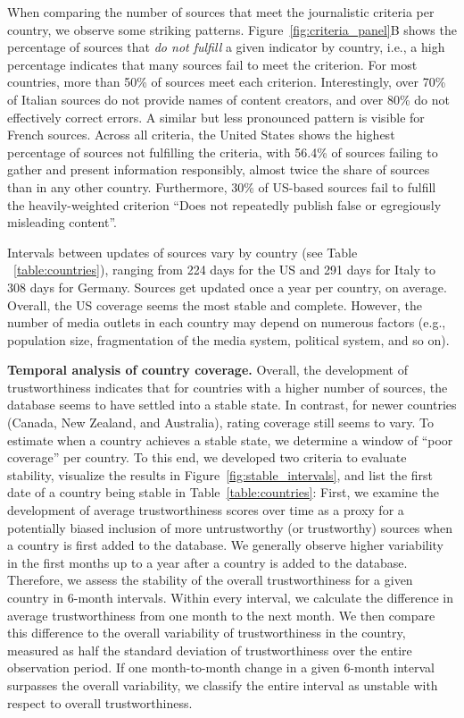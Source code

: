\documentclass[12pt,twoside]{article}
\begin{document}
When comparing the number of sources that meet the journalistic criteria per country, we observe some striking patterns. 
Figure~\ref{fig:criteria_panel}B shows the percentage of sources that \emph{do not fulfill} a given indicator by country, i.e., a high percentage indicates that many sources fail to meet the criterion.
For most countries, more than 50\% of sources meet each criterion. 
Interestingly, over 70\% of Italian sources do not provide names of content creators, and over 80\% do not effectively correct errors. 
A similar but less pronounced pattern is visible for French sources. 
Across all criteria, the United States shows the highest percentage of sources not fulfilling the criteria, with 56.4\% of sources failing to gather and present information responsibly, almost twice the share of sources than in any other country.
Furthermore, 30\% of US-based sources fail to fulfill the heavily-weighted criterion ``Does not repeatedly publish false or egregiously misleading content''.

Intervals between updates of sources vary by country (see Table ~\ref{table:countries}), ranging from 224 days for the US and 291 days for Italy to 308 days for Germany. 
Sources get updated once a year per country, on average. 
Overall, the US coverage seems the most stable and complete. 
However, the number of media outlets in each country may depend on numerous factors (e.g., population size, fragmentation of the media system, political system, and so on). 


\textbf{Temporal analysis of country coverage.}
Overall, the development of trustworthiness indicates that for countries with a higher number of sources, the database seems to have settled into a stable state. 
In contrast, for newer countries (Canada, New Zealand, and Australia), rating coverage still seems to vary.
To estimate when a country achieves a stable state, we determine a window of ``poor coverage'' per country.
To this end, we developed two criteria to evaluate stability, visualize the results in Figure~\ref{fig:stable_intervals}, and list the first date of a country being stable in Table~\ref{table:countries}:
First, we examine the development of average trustworthiness scores over time as a proxy for a potentially biased inclusion of more untrustworthy (or trustworthy) sources when a country is first added to the database. 
We generally observe higher variability in the first months up to a year after a country is added to the database. 
Therefore, we assess the stability of the overall trustworthiness for a given country in 6-month intervals. 
Within every interval, we calculate the difference in average trustworthiness from one month to the next month. 
We then compare this difference to the overall variability of trustworthiness in the country, measured as half the standard deviation of trustworthiness over the entire observation period. 
If one month-to-month change in a given 6-month interval surpasses the overall variability, we classify the entire interval as unstable with respect to overall trustworthiness. 
\end{document}

